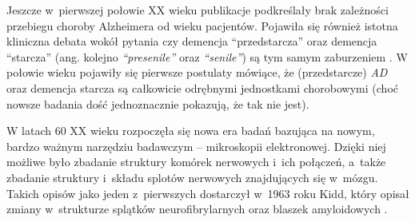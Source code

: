 Jeszcze w~pierwszej połowie XX wieku publikacje podkreślały brak zależności przebiegu choroby Alzheimera od wieku pacjentów.
Pojawiła się również istotna kliniczna debata wokół pytania czy demencja ``przedstarcza'' oraz demencja ``starcza'' (ang. kolejno \emph{``presenile''} oraz \emph{``senile''}) są tym samym zaburzeniem \cite{jellinger2006alzheimer}.
W połowie wieku pojawiły się pierwsze postulaty mówiące, że (przedstarcze) \emph{AD} oraz demencja starcza są całkowicie odrębnymi jednostkami chorobowymi (choć nowsze badania dość jednoznacznie pokazują, że tak nie jest).

W latach 60 XX wieku rozpoczęła się nowa era badań bazująca na nowym, bardzo ważnym narzędziu badawczym -- mikroskopii elektronowej.
Dzięki niej możliwe było zbadanie struktury komórek nerwowych i~ich połączeń, a~także zbadanie struktury i~składu splotów nerwowych znajdujących się w~mózgu.
Takich opisów jako jeden z~pierwszych dostarczył w~1963 roku Kidd, który opisał zmiany w~strukturze splątków neurofibrylarnych oraz blaszek amyloidowych \cite{kidd1963paired}.

